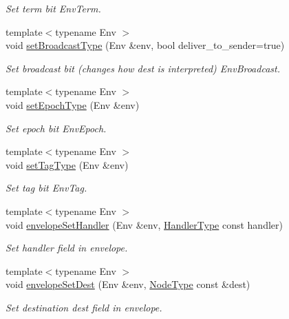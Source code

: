 \begin{DoxyCompactItemize}
\begin{DoxyCompactList}\small\item\em Set term bit {\ttfamily Env\+Term}. \end{DoxyCompactList}\item 
{\footnotesize template$<$typename Env $>$ }\\void \hyperlink{namespacevt_af6e10f3d27abb3321ca34830880c0f7a}{set\+Broadcast\+Type} (Env \&env, bool deliver\+\_\+to\+\_\+sender=true)
\begin{DoxyCompactList}\small\item\em Set broadcast bit (changes how {\ttfamily dest} is interpreted) {\ttfamily Env\+Broadcast}. \end{DoxyCompactList}\item 
{\footnotesize template$<$typename Env $>$ }\\void \hyperlink{namespacevt_afb12c8cb2f8d47e2f06ffa25574f0dd0}{set\+Epoch\+Type} (Env \&env)
\begin{DoxyCompactList}\small\item\em Set epoch bit {\ttfamily Env\+Epoch}. \end{DoxyCompactList}\item 
{\footnotesize template$<$typename Env $>$ }\\void \hyperlink{namespacevt_ad088db89648b82eef7ca9b4837a907cd}{set\+Tag\+Type} (Env \&env)
\begin{DoxyCompactList}\small\item\em Set tag bit {\ttfamily Env\+Tag}. \end{DoxyCompactList}\item 
{\footnotesize template$<$typename Env $>$ }\\void \hyperlink{namespacevt_a48ddc3677e112fd6f53d0f918c21300e}{envelope\+Set\+Handler} (Env \&env, \hyperlink{namespacevt_af64846b57dfcaf104da3ef6967917573}{Handler\+Type} const handler)
\begin{DoxyCompactList}\small\item\em Set handler field in envelope. \end{DoxyCompactList}\item 
{\footnotesize template$<$typename Env $>$ }\\void \hyperlink{namespacevt_a78ef1cf108e91a92d83c525fd16fbd4d}{envelope\+Set\+Dest} (Env \&env, \hyperlink{namespacevt_a866da9d0efc19c0a1ce79e9e492f47e2}{Node\+Type} const \&dest)
\begin{DoxyCompactList}\small\item\em Set destination {\ttfamily dest} field in envelope. \end{DoxyCompactList}\item 

\end{DoxyCompactItemize}
